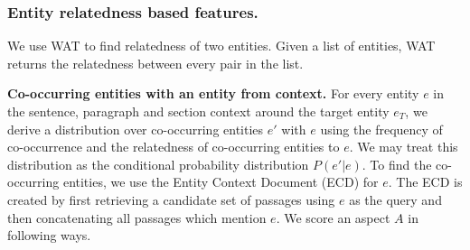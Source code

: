 \subsubsection{Entity relatedness based features.} 
\label{subsubsec:Entity relatedness based features}
We use WAT \cite{piccinno2014wat} to find relatedness of two entities. Given a list of entities, WAT returns the relatedness between every pair in the list.


\textbf{Co-occurring entities with an entity from context.}
For every entity $e$ in the sentence, paragraph and section context around the target entity $e_T$, we derive a distribution over co-occurring entities $e'$
with $e$ using the frequency of co-occurrence and the relatedness of co-occurring entities to $e$. We may treat this distribution as the conditional probability distribution $P(e' \vert e)$. To find the co-occurring entities, we use the Entity Context Document (ECD) \cite{chatterjee2019why} for $e$. The ECD is created by first retrieving a candidate set of passages using $e$ as the query and then concatenating all passages which mention $e$.
We score an aspect $A$ in following ways.

